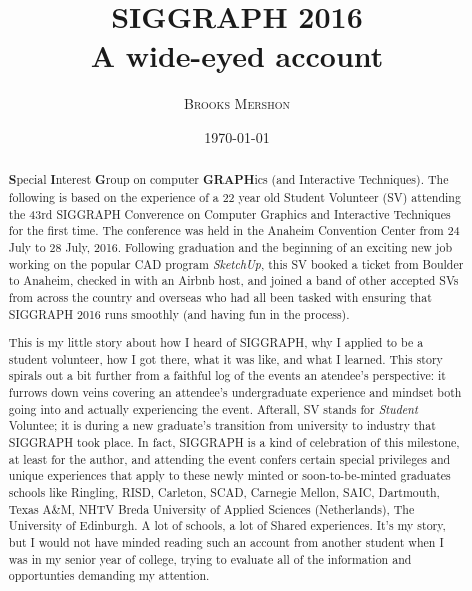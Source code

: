 \documentclass[a4paper, 11pt]{article} %
\title{\textbf{SIGGRAPH 2016}\\ %
A wide-eyed account} %
\author{\textsc{Brooks Mershon}} %
\date{\today} %
\begin{document}
\maketitle %

\eject


\renewcommand{\abstractname}{Forward} %

\begin{abstract}
\textbf{S}pecial \textbf{I}nterest \textbf{G}roup on computer \textbf{GRAPH}ics (and Interactive Techniques). The following is based on the experience of a 22 year old Student Volunteer (SV) attending the 43rd SIGGRAPH Converence on Computer Graphics and Interactive Techniques for the first time. The conference was held in the Anaheim Convention Center from 24 July to 28 July, 2016. Following graduation and the beginning of an exciting new job working on the popular CAD program \textit{SketchUp}, this SV booked a ticket from Boulder to Anaheim, checked in with an Airbnb host, and joined a band of other accepted SVs from across the country and overseas who had all been tasked with ensuring that SIGGRAPH 2016 runs smoothly (and having fun in the process).

This is my little story about how I heard of SIGGRAPH, why I applied to be a student volunteer, how I got there, what it was like, and what I learned. This story spirals out a bit further from a faithful log of the events an atendee's perspective: it furrows down veins covering an attendee's undergraduate experience and mindset both going into and actually experiencing the event. Afterall, SV stands for \textit{Student} Voluntee; it is during a new graduate's transition from university to industry that SIGGRAPH took place. In fact, SIGGRAPH is a kind of celebration of this milestone, at least for the author, and attending the event confers certain special privileges and unique experiences that apply to these newly minted or soon-to-be-minted graduates schools like Ringling, RISD, Carleton, SCAD, Carnegie Mellon, SAIC, Dartmouth, Texas A\&M, NHTV Breda University of Applied Sciences (Netherlands), The University of Edinburgh. A lot of schools, a lot of  Shared experiences. It's my story, but I would not have minded reading such an account from another student when I was in my senior year of college, trying to evaluate all of the information and opportunties demanding my attention.


\end{abstract}
\end{document}
